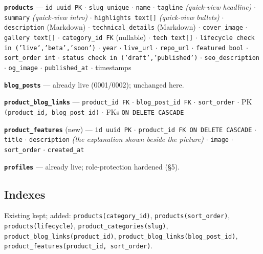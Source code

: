 \documentclass[11pt,a4paper]{article}
\begin{document}
\medskip
\textbf{\texttt{products}} --- \texttt{id uuid PK} \(\cdot\) \texttt{slug unique} \(\cdot\)
\texttt{name} \(\cdot\) \texttt{tagline} \emph{(quick-view headline)} \(\cdot\)
\texttt{summary} \emph{(quick-view intro)} \(\cdot\) \texttt{highlights text[]}
\emph{(quick-view bullets)} \(\cdot\) \texttt{description} (Markdown) \(\cdot\)
\texttt{technical\_details} (Markdown) \(\cdot\) \texttt{cover\_image} \(\cdot\)
\texttt{gallery text[]} \(\cdot\) \texttt{category\_id FK} (nullable) \(\cdot\)
\texttt{tech text[]} \(\cdot\) \texttt{lifecycle check in ('live','beta','soon')} \(\cdot\)
\texttt{year} \(\cdot\) \texttt{live\_url} \(\cdot\) \texttt{repo\_url} \(\cdot\)
\texttt{featured bool} \(\cdot\) \texttt{sort\_order int} \(\cdot\)
\texttt{status check in ('draft','published')} \(\cdot\) \texttt{seo\_description}
\(\cdot\) \texttt{og\_image} \(\cdot\) \texttt{published\_at} \(\cdot\) timestamps

\medskip
\textbf{\texttt{blog\_posts}} --- already live (0001/0002); unchanged here.

\medskip
\textbf{\texttt{product\_blog\_links}} --- \texttt{product\_id FK} \(\cdot\)
\texttt{blog\_post\_id FK} \(\cdot\) \texttt{sort\_order} \(\cdot\) PK
\texttt{(product\_id, blog\_post\_id)} \(\cdot\) FKs \texttt{ON DELETE CASCADE}

\medskip
\textbf{\texttt{product\_features}} (new) --- \texttt{id uuid PK} \(\cdot\)
\texttt{product\_id FK ON DELETE CASCADE} \(\cdot\) \texttt{title} \(\cdot\)
\texttt{description} \emph{(the explanation shown beside the picture)} \(\cdot\)
\texttt{image} \(\cdot\) \texttt{sort\_order} \(\cdot\) \texttt{created\_at}

\medskip
\textbf{\texttt{profiles}} --- already live; role-protection hardened (\S5).

\subsection{Indexes}
Existing kept; added: \texttt{products(category\_id)}, \texttt{products(sort\_order)},
\texttt{products(lifecycle)}, \texttt{product\_categories(slug)},
\texttt{product\_blog\_links(product\_id)}, \texttt{product\_blog\_links(blog\_post\_id)},
\texttt{product\_features(product\_id, sort\_order)}.
\end{document}
